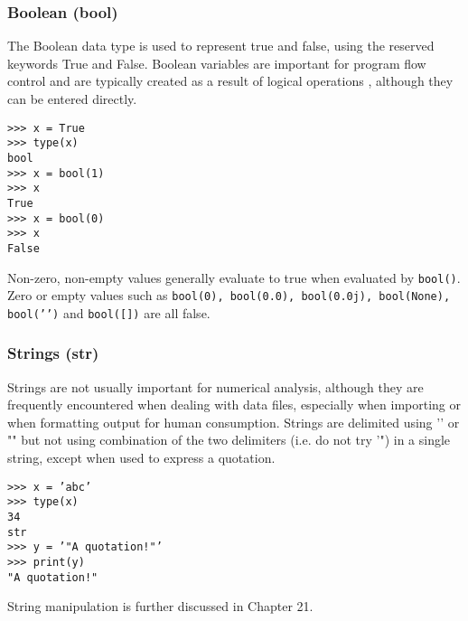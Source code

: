 \documentclass[KSmain.tex]{subfiles}
\begin{document}
\subsubsection{Boolean (bool)}
The Boolean data type is used to represent true and false, using the reserved keywords True and False.
Boolean variables are important for program flow control and are typically created as a
result of logical operations , although they can be entered directly.
\begin{framed}
\begin{verbatim}
>>> x = True
>>> type(x)
bool
>>> x = bool(1)
>>> x
True
>>> x = bool(0)
>>> x
False
\end{verbatim}
\end{framed}
Non-zero, non-empty values generally evaluate to true when evaluated by \texttt{bool()}. Zero or empty values
such as \texttt{bool(0), bool(0.0), bool(0.0j), bool(None), bool(’’)} and \texttt{bool([])} are all false.
\subsubsection{Strings (str)}
Strings are not usually important for numerical analysis, although they are frequently encountered when
dealing with data files, especially when importing or when formatting output for human consumption.
Strings are delimited using ’’ or "" but not using combination of the two delimiters (i.e. do not try ’") in
a single string, except when used to express a quotation.
\begin{framed}
\begin{verbatim}
>>> x = ’abc’
>>> type(x)
34
str
>>> y = ’"A quotation!"’
>>> print(y)
"A quotation!"
\end{verbatim}
\end{framed}
String manipulation is further discussed in Chapter 21.

\newpage
\end{document}
